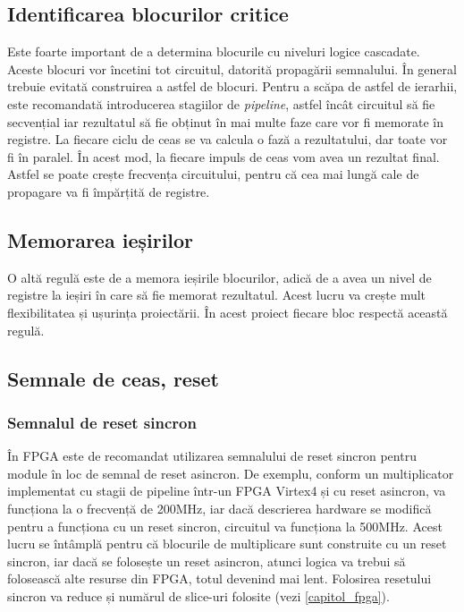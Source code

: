 \documentclass[12pt,twoside,a4paper,fleqn]{book}
\begin{document}
\subsection{Identificarea blocurilor critice}
Este foarte important de a determina blocurile cu niveluri logice cascadate. Aceste blocuri vor încetini tot circuitul, datorită propagării semnalului. În general trebuie evitată construirea a astfel de blocuri. Pentru a scăpa de astfel de ierarhii, este recomandată introducerea stagiilor de \emph{pipeline}, astfel încât circuitul să fie secvențial iar rezultatul să fie obținut în mai multe faze care vor fi memorate în registre. La fiecare ciclu de ceas se va calcula o fază a rezultatului, dar toate vor fi în paralel. În acest mod, la fiecare impuls de ceas vom avea un rezultat final. Astfel se poate crește frecvența circuitului, pentru că cea mai lungă cale de propagare va fi împărțită de registre. \cite{high_performance_fpga}
\subsection{Memorarea ieșirilor}
O altă regulă este de a memora ieșirile blocurilor, adică de a avea un nivel de registre la ieșiri în care să fie memorat rezultatul. Acest lucru va crește mult flexibilitatea și ușurința proiectării. În acest proiect fiecare bloc respectă această regulă. \cite{xilinx_coding_practices}
\subsection{Semnale de ceas, reset}
\subsubsection{Semnalul de reset sincron}
În FPGA este de recomandat utilizarea semnalului de reset sincron pentru module în loc de semnal de reset asincron. De exemplu, conform \cite{xilinx_coding_practices} un multiplicator implementat cu stagii de pipeline într-un FPGA Virtex4 și cu reset asincron, va funcționa la o frecvență de 200MHz, iar dacă descrierea hardware se modifică pentru a funcționa cu un reset sincron, circuitul va funcționa la 500MHz. Acest lucru se întâmplă pentru că blocurile de multiplicare sunt construite cu un reset sincron, iar dacă se folosește un reset asincron, atunci logica va trebui să folosească alte resurse din FPGA, totul devenind mai lent. Folosirea resetului sincron va reduce și numărul de slice-uri folosite (vezi \ref{capitol_fpga}).
\end{document}
